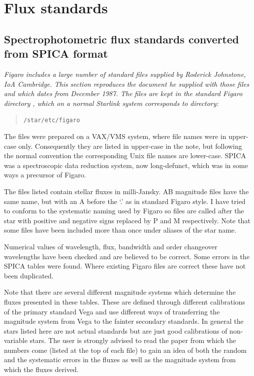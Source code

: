 \newpage %
\section{Flux standards}


\subsection{\label{standard1}Spectrophotometric flux standards converted from SPICA format}

{\em
   Figaro includes a large number of standard files supplied by Roderick
   Johnstone, IoA Cambridge.  This section reproduces the document he
   supplied with those files and which dates from December 1987.  The
   files are kept in the standard Figaro directory 
{,}
   which on a normal Starlink system corresponds to directory:

  \begin{quote}
   {\tt /star/etc/figaro}
  \end{quote}

   The files were prepared on a VAX/VMS system, where file names were
   in upper-case only.  Consequently they are listed in upper-case in the
   note, but following the normal convention the corresponding Unix file
   names are lower-case.  SPICA was a spectroscopic data reduction system,
   now long-defunct, which was in some ways a precursor of Figaro.
\/}

   The files listed contain stellar fluxes in milli-Jansky. AB
   magnitude files have the same name, but with an A before the `.' as
   in standard Figaro style. I have tried to conform to the systematic
   naming used by Figaro so files are called after the star with
   positive and negative signs replaced by P and M respectively. Note
   that some files have been included more than once under aliases of
   the star name.

   Numerical values of wavelength, flux, bandwidth and order changeover
   wavelengths have been checked and are believed to be correct. Some
   errors in the SPICA tables were found. Where existing Figaro files
   are correct these have not been duplicated.

   Note that there are several different magnitude systems which
   determine the fluxes presented in these tables. These are defined
   through different calibrations of the primary standard Vega and use
   different ways of transferring the magnitude system from Vega to the
   fainter secondary standards. In general the stars listed here are not
   actual standards but are just good calibrations of non-variable
   stars. The user is strongly advised to read the paper from which the
   numbers come (listed at the top of each file) to gain an idea of both
   the random and the systematic errors in the fluxes as well as the
   magnitude system from which the fluxes derived.


